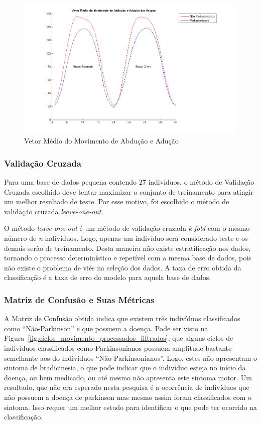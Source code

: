 \begin{figure}[!htbp]
 \centering
 \includegraphics[scale=0.50]{./img/vetormedioaducao.png}
 \caption{Vetor Médio do Movimento de Abdução e Adução}
 \label{fig:vetor_medio_abducao}
\end{figure}


\subsubsection{Validação Cruzada}\label{validacao_cruzada_svm}
Para uma base de dados pequena contendo 27 indivíduos, o método de Validação Cruzada escolhido deve tentar maximizar o conjunto de treinamento para atingir um melhor resultado de teste. Por esse motivo, foi escolhido o método de validação cruzada \textit{leave-one-out}. 

O método \textit{leave-one-out} é um método de validação cruzada \textit{k-fold} com o mesmo número de \textit{n} indivíduos. Logo, apenas um indivíduo será considerado teste e os demais serão de treinamento. Desta maneira não existe estratificação nos dados, tornando o processo determinístico e repetível com a mesma base de dados, pois não existe o problema de viés na seleção dos dados. A taxa de erro obtida da classificação é a taxa de erro do modelo para aquela base de dados. 

\subsubsection{Matriz de Confusão e Suas Métricas}
A Matriz de Confusão obtida indica que existem três indivíduos classificados como ``Não-Parkinson'' e que possuem a doença. Pode ser visto na Figura~\ref{fig:ciclos_movimento_processados_filtrados}, que alguns ciclos de indivíduos classificados como Parkinsonianos possuem amplitude bastante semelhante aos do indivíduos ``Não-Parkinsonianos''. Logo, estes não apresentam o sintoma de bradicinesia, o que pode indicar que o indivíduo esteja no início da doença, ou bem medicado, ou até mesmo não apresenta este sintoma motor. 
Um resultado, que não era esperado nesta pesquisa é a ocorrência de indivíduos que não possuem a doença de parkinson mas mesmo assim foram classificados com o sintoma. Isso requer um melhor estudo para identificar o que pode ter ocorrido na classificação.

